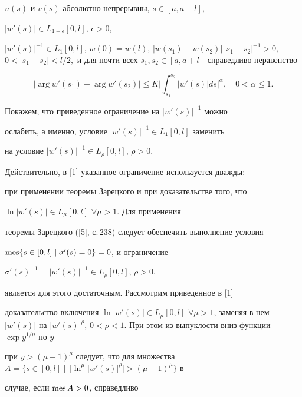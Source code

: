 $u(s)$ и $v(s)$ абсолютно непрерывны, $s \in [a,a + l]$,


$|w'(s)| \in L_{1+\epsilon}[0,l]$, $\epsilon > 0$,


$|w'(s)|^{-1} \in L_1[0,l]$, $w(0) = w(l)$, $|w(s_1) -w(s_2)|\, |s_1 -


s_2|^{-1} > 0$, $0 < |s_1 - s_2| < l/2,$ и для почти всех $s_1, s_2


\in [a,a + l]$ справедливо неравенство


$$


|\arg w'(s_1) - \arg w'(s_2)| \leq K\bigg|\int_{s_1}^{s_2}


|w'(s)|ds\bigg|^{\alpha},\quad 0 < \alpha \leq 1.


$$


Покажем, что приведенное ограничение на $|w'(s)|^{-1}$ можно


ослабить, а именно, условие $|w'(s)|^{-1} \in L_1[0,l]$ заменить


на условие $|w'(s)|^{-1} \in L_{\rho}[0,l]$, $\rho > 0$.


Действительно, в [1] указанное ограничение используется дважды:


при применении теоремы Зарецкого и при доказательстве того, что


$\ln|w'(s)| \in L_{\mu}[0,l]$ $\forall \mu > 1$. Для применения


теоремы Зарецкого ([5], с.\,238) следует обеспечить выполнение условия


$\operatorname{mes} \{s \in [0,l] \mid \sigma'(s) = 0\} = 0$, и ограничение


$\sigma'(s) ^{-1} = |w'(s)|^{-1} \in L_{\rho}[0,l]$, $\rho > 0$,


является для этого достаточным. Рассмотрим приведенное в [1]


доказательство включения $\ln |w'(s)| \in L_{\mu}[0,l]$ $\forall


\mu > 1$, заменяя в нем $|w'(s)|$ на $|w'(s)|^{\rho}$, $0 < \rho <


1$. При этом из выпуклости вниз функции $\exp y^{1/\mu}$ по $y$


при $y > (\mu - 1)^{\mu}$ следует, что для множества $A = \{s \in


[0,l] \mid\, \big|\ln^{\mu}|w'(s)|^{\rho}\big| > (\mu - 1)^{\mu}\}$ в


случае, если $\operatorname{mes} A > 0$, справедливо


$$


\exp {} \leq \\


